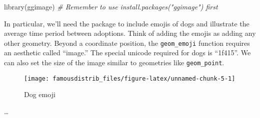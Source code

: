 \documentclass[
]{article}
\newenvironment{Shaded}{\begin{snugshade}}{\end{snugshade}}
\newcommand{\CommentTok}[1]{\textcolor[rgb]{0.56,0.35,0.01}{\textit{#1}}}
\newcommand{\FunctionTok}[1]{\textcolor[rgb]{0.00,0.00,0.00}{#1}}
\newcommand{\NormalTok}[1]{#1}
\begin{document}
\begin{Shaded}
\begin{Highlighting}[]
\FunctionTok{library}\NormalTok{(ggimage) }\CommentTok{\# Remember to use install.packages("ggimage") first}
\end{Highlighting}
\end{Shaded}

In particular, we'll need the package to include emojis of dogs and illustrate the average time period between adoptions. Think of adding the emojis as adding any other geometry. Beyond a coordinate position, the \texttt{geom\_emoji} function requires an aesthetic called ``image.'' The special unicode required for dogs is ``1f415''. We can also set the size of the image similar to geometries like \texttt{geom\_point}.

\begin{figure}

{\centering \texttt{[image: famousdistrib\_files/figure-latex/unnamed-chunk-5-1]} 

}

\caption{Dog emoji}\label{fig:unnamed-chunk-5}
\end{figure}

\ldots{}
\end{document}
